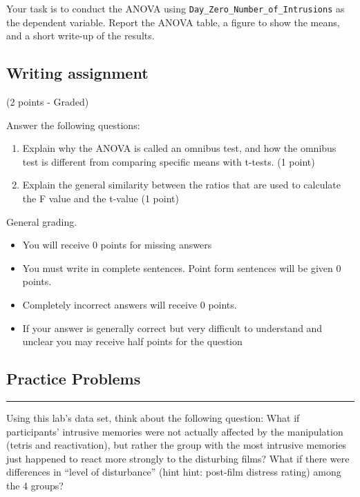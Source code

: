 \documentclass[
]{book}
\providecommand{\tightlist}{%
  \setlength{\itemsep}{0pt}\setlength{\parskip}{0pt}}
\begin{document}
Your task is to conduct the ANOVA using \texttt{Day\_Zero\_Number\_of\_Intrusions} as the dependent variable. Report the ANOVA table, a figure to show the means, and a short write-up of the results.

\hypertarget{writing-assignment-7}{%
\subsection{Writing assignment}\label{writing-assignment-7}}

(2 points - Graded)

Answer the following questions:

\begin{enumerate}
\def\labelenumi{\arabic{enumi}.}
\item
  Explain why the ANOVA is called an omnibus test, and how the omnibus test is different from comparing specific means with t-tests. (1 point)
\item
  Explain the general similarity between the ratios that are used to calculate the F value and the t-value (1 point)
\end{enumerate}

General grading.

\begin{itemize}
\tightlist
\item
  You will receive 0 points for missing answers
\item
  You must write in complete sentences. Point form sentences will be given 0 points.
\item
  Completely incorrect answers will receive 0 points.
\item
  If your answer is generally correct but very difficult to understand and unclear you may receive half points for the question
\end{itemize}

\hypertarget{practice-problems-6}{%
\subsection{Practice Problems}\label{practice-problems-6}}

\begin{center}\rule{0.5\linewidth}{0.5pt}\end{center}

Using this lab's data set, think about the following question: What if participants' intrusive memories were not actually affected by the manipulation (tetris and reactivation), but rather the group with the most intrusive memories just happened to react more strongly to the disturbing films? What if there were differences in ``level of disturbance'' (hint hint: post-film distress rating) among the 4 groups?
\end{document}
